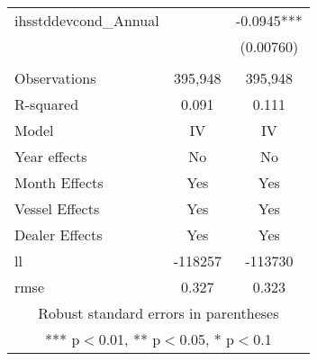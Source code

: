 \begin{tabular}{lcc}
ihsstddevcond\_Annual &  & -0.0945*** \\
 &  & (0.00760) \\
 &  &  \\
Observations & 395,948 & 395,948 \\
R-squared & 0.091 & 0.111 \\
Model & IV & IV \\
Year effects & No & No \\
Month Effects & Yes & Yes \\
Vessel Effects & Yes & Yes \\
Dealer Effects & Yes & Yes \\
ll & -118257 & -113730 \\
 rmse & 0.327 & 0.323 \\ \hline
\multicolumn{3}{c}{ Robust standard errors in parentheses} \\
\multicolumn{3}{c}{ *** p$<$0.01, ** p$<$0.05, * p$<$0.1} \\
\end{tabular}

